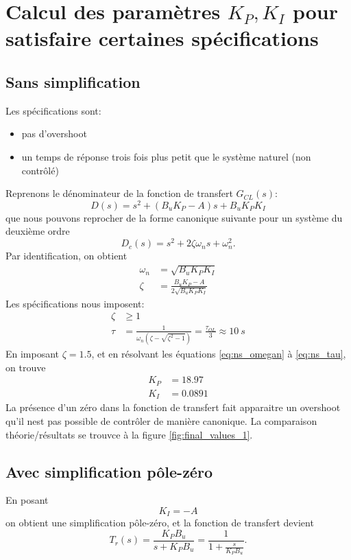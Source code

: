 \documentclass[frenchb, paper=a4, fontsize=11pt]{scrartcl}
\numberwithin{equation}{section}					%
\numberwithin{figure}{section}					%
\numberwithin{table}{section}						%
\begin{document}
\section{Calcul des paramètres $K_P,K_I$ pour satisfaire certaines spécifications}

\subsection{Sans simplification}
Les spécifications sont:
\begin{itemize}
\item pas d'overshoot
\item un temps de réponse trois fois plus petit que le système naturel (non contrôlé)
\end{itemize}
Reprenons le dénominateur de la fonction de transfert $G_{CL}(s)$:
\begin{equation}
D(s) = s^2 +(B_u K_P -A)s + B_u K_P K_I
\end{equation}
que nous pouvons reprocher de la forme canonique suivante pour un système du deuxième ordre
\begin{equation}
D_c(s) = s^2 + 2\zeta \omega_n s + \omega_n^2.
\end{equation}
Par identification, on obtient
\begin{align}
\omega_n &= \sqrt{B_u K_P K_I} \label{eq:ns_omegan}\\
\zeta &= \frac{B_u K_P-A}{2\sqrt{B_u K_P K_I}}
\end{align}
Les spécifications nous imposent:
\begin{align}
\zeta &\ge 1\\
\tau & = \frac{1}{\omega_n(\zeta - \sqrt{\zeta^2-1})} = \frac{\tau_{OL}}{3}\approx \SI{10}{s} \label{eq:ns_tau}
\end{align}
En imposant $\zeta = 1.5$, et en résolvant les équations \ref{eq:ns_omegan} à \ref{eq:ns_tau}, on trouve
\begin{align}
K_P &= 18.97\\
K_I &= 0.0891
\end{align}
La présence d'un zéro dans la fonction de transfert fait apparaitre un overshoot qu'il nest pas possible de contrôler de manière canonique. 
La comparaison théorie/résultats se trouvce à la figure \ref{fig:final_values_1}.


\subsection{Avec simplification pôle-zéro}
En posant 
\begin{equation}
K_I = -A
\end{equation}
on obtient une simplification pôle-zéro, et la fonction de transfert devient
\begin{equation}
T_r(s) = \frac{K_P B_u}{s+K_P B_u}= \frac{1}{1+\frac{s}{K_P B_u}}.
\end{equation}
\end{document}
